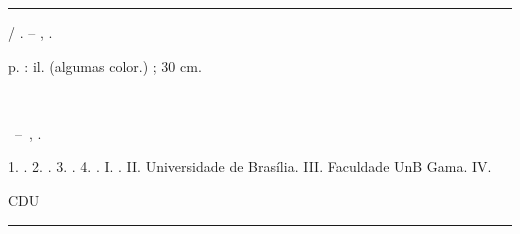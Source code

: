 \begin{fichacatalografica}
\vspace*{\fill}
\hrule
\begin{center}
\begin{minipage}[t]{12.5cm}
\small
\raggedright  %

\imprimirautor

\imprimirtitulo / \imprimirautor. -- \imprimirlocal, \imprimirdata.

\pageref{LastPage} p. : il. (algumas color.) ; 30 cm.

\imprimirorientadorRotulo~\imprimirorientador

\imprimirtipotrabalho~--~\imprimirinstituicao, \imprimirdata.

1. \imprimirpalavrachaveum.
2. \imprimirpalavrachavedois.
3. \imprimirpalavrachavetres.
4. \imprimirpalavrachavequatro.
I. \imprimirorientador.
II. Universidade de Brasília.
III. Faculdade UnB Gama.
IV. \imprimirtitulo

\hspace{8.75cm} CDU \nomecdu \\

\end{minipage}
\end{center}
\hrule
\end{fichacatalografica}
